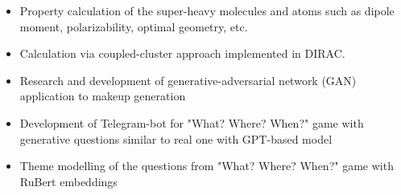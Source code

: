 \begin{itemize}
    \item Property calculation of the super-heavy molecules and atoms such as dipole moment, polarizability, optimal geometry, etc.
    \item Calculation via coupled-cluster approach implemented in DIRAC.
\end{itemize}

\begin{itemize}
    \item Research and development of generative-adversarial network (GAN) application to makeup generation
\end{itemize}
\begin{itemize}
    \item Development of Telegram-bot for "What? Where? When?" game with generative questions similar to real one with GPT-based model
    \item Theme modelling of the questions from "What? Where? When?" game with RuBert embeddings
\end{itemize}

\cvproject{}